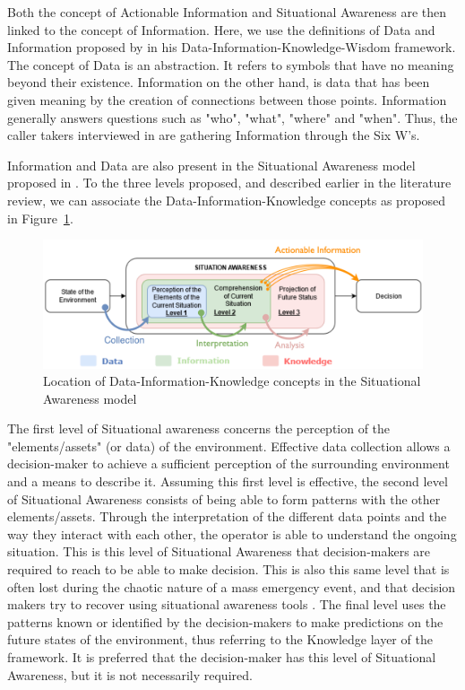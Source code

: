 Both the concept of Actionable Information and Situational Awareness are then linked to the concept of Information.
Here, we use the definitions of Data and Information proposed by \textcite{ackoffDataWisdom1989} in his Data-Information-Knowledge-Wisdom framework.
The concept of Data is an abstraction.
It refers to symbols that have no meaning beyond their existence.
Information on the other hand, is data that has been given meaning by the creation of connections between those points.
Information generally answers questions such as "who", "what", "where" and "when".
Thus, the caller takers interviewed in \textcite{kropczynskiIdentifyingActionableInformation2018} are gathering Information through the Six W's.

Information and Data are also present in the Situational Awareness model proposed in \textcite{endsleyTheorySituationAwareness1995}.
To the three levels proposed, and described earlier in the literature review, we can associate the Data-Information-Knowledge concepts as proposed in Figure~\ref{information:SA-DIK}.

\begin{figure}
    \centering
    \includegraphics[width=\textwidth]{figures/chap-3/Fig2-2.pdf}
    \caption{Location of Data-Information-Knowledge concepts in the Situational Awareness model}
    \label{information:SA-DIK}
\end{figure}

The first level of Situational awareness concerns the perception of the "elements/assets" (or data) of the environment.
Effective data collection allows a decision-maker to achieve a sufficient perception of the surrounding environment and a means to describe it.
Assuming this first level is effective, the second level of Situational Awareness consists of being able to form patterns with the other elements/assets.
Through the interpretation of the different data points and the way they interact with each other, the operator is able to understand the ongoing situation.
This is this level of Situational Awareness that decision-makers are required to reach to be able to make decision.
This is also this same level that is often lost during the chaotic nature of a mass emergency event, and that decision makers try to recover using situational awareness tools \parencite{endsleyTheorySituationAwareness1995}.
The final level uses the patterns known or identified by the decision-makers to make predictions on the future states of the environment, thus referring to the Knowledge layer of the framework.
It is preferred that the decision-maker has this level of Situational Awareness, but it is not necessarily required.

